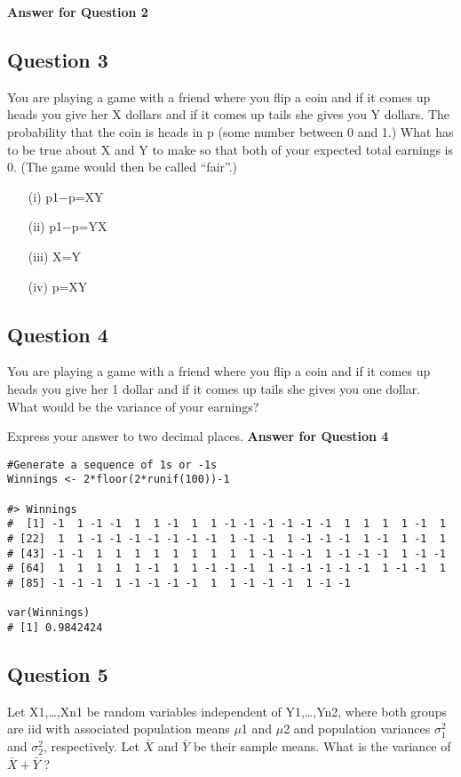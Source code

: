 \documentclass[]{article}
\begin{document}
\textbf{Answer for Question 2}
\subsection{Question 3}
You are playing a game with a friend where you flip a coin and if it comes up heads you give her X dollars and if it comes up tails she gives you Y dollars. 
The probability that the coin is heads in p (some number between 0 and 1.) 
What has to be true about X and Y to make so that both of your expected total earnings is 0. 
(The game would then be called “fair”.)

\begin{itemize}
\item[(i)] p1−p=XY
\item[(ii)] p1−p=YX
\item[(iii)] X=Y
\item[(iv)] p=XY
\end{itemize}

\subsection{Question 4}
You are playing a game with a friend where you flip a coin and if it comes up heads you give her 1 dollar and 
if it comes up tails she gives you one dollar. What would be the variance of your earnings?

Express your answer to two decimal places.
\textbf{Answer for Question 4}

\begin{verbatim}
#Generate a sequence of 1s or -1s
Winnings <- 2*floor(2*runif(100))-1

#> Winnings
#  [1] -1  1 -1 -1  1  1 -1  1  1 -1 -1 -1 -1 -1 -1  1  1  1  1 -1  1
# [22]  1  1 -1 -1 -1 -1 -1 -1 -1  1 -1 -1  1 -1 -1 -1  1 -1  1 -1  1
# [43] -1 -1  1  1  1  1  1  1  1  1  1 -1 -1 -1  1 -1 -1 -1  1 -1 -1
# [64]  1  1  1  1  1 -1  1  1 -1 -1 -1  1 -1 -1 -1 -1 -1  1 -1 -1  1
# [85] -1 -1 -1  1 -1 -1 -1 -1  1  1 -1 -1 -1  1 -1 -1

var(Winnings)
# [1] 0.9842424
\end{verbatim}

\subsection{Question 5}
Let X1,…,Xn1 be random variables independent of Y1,…,Yn2, where both groups are iid with associated population means $\mu$1 and $\mu$2 and population variances $\sigma^2_1$ and $\sigma^2_2$, respectively. Let $\bar{X}$ and $\bar{Y}$ be their sample means. What is the variance of $\bar{X} + \bar{Y}$ ?
\end{document}
